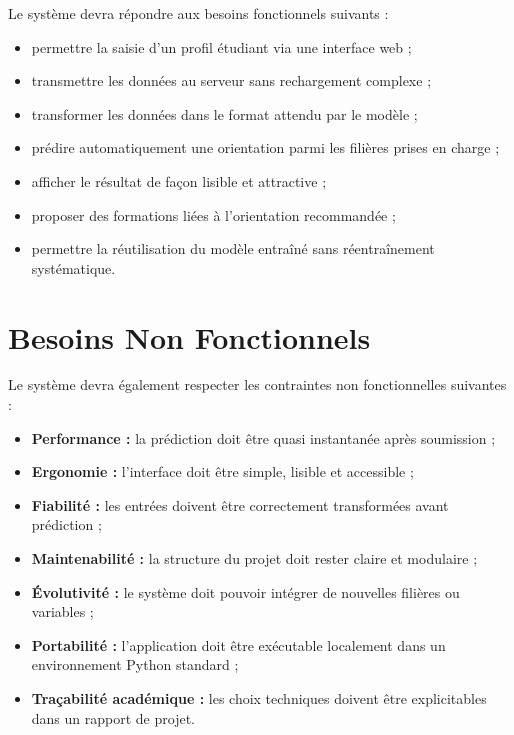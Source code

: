 \documentclass[12pt,a4paper]{report}
\begin{document}
Le système devra répondre aux besoins fonctionnels suivants :
\begin{itemize}[label=--]
    \item permettre la saisie d'un profil étudiant via une interface web ;
    \item transmettre les données au serveur sans rechargement complexe ;
    \item transformer les données dans le format attendu par le modèle ;
    \item prédire automatiquement une orientation parmi les filières prises en charge ;
    \item afficher le résultat de façon lisible et attractive ;
    \item proposer des formations liées à l'orientation recommandée ;
    \item permettre la réutilisation du modèle entraîné sans réentraînement systématique.
\end{itemize}

\chapter{Besoins Non Fonctionnels}

Le système devra également respecter les contraintes non fonctionnelles suivantes :
\begin{itemize}[label=--]
    \item \textbf{Performance :} la prédiction doit être quasi instantanée après soumission ;
    \item \textbf{Ergonomie :} l'interface doit être simple, lisible et accessible ;
    \item \textbf{Fiabilité :} les entrées doivent être correctement transformées avant prédiction ;
    \item \textbf{Maintenabilité :} la structure du projet doit rester claire et modulaire ;
    \item \textbf{Évolutivité :} le système doit pouvoir intégrer de nouvelles filières ou variables ;
    \item \textbf{Portabilité :} l'application doit être exécutable localement dans un environnement Python standard ;
    \item \textbf{Traçabilité académique :} les choix techniques doivent être explicitables dans un rapport de projet.
\end{itemize}

\end{document}
